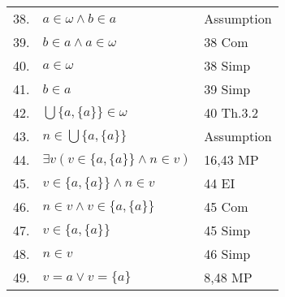\documentclass[12pt, a4paper]{article}
\begin{document}
\begin{table}[h!]
    \begin{center}
        \begin{tabular}{l l l}
        \hline
        
        38.& $a\in\omega\wedge b\in a$\hspace{140mm} & Assumption\\
        
        39.& \hspace{10mm}$b\in a\wedge a\in\omega$ & 38 Com\\
        
        40.& \hspace{10mm}$a\in\omega$ & 38 Simp\\
        
        41.& \hspace{10mm}$b\in a$ & 39 Simp\\
        
        42.& \hspace{10mm}$\bigcup\{a,\{a\}\}\in\omega$ & 40 Th.3.2\\
        
        43.& \hspace{10mm}$n\in\bigcup\{a,\{a\}\}$ & Assumption\\
        
        44.& \hspace{20mm}$\exists v(v\in\{a,\{a\}\}\wedge n\in v)$ & 16,43 MP\\
        
        45.& \hspace{20mm}$v\in\{a,\{a\}\}\wedge n\in v$ & 44 EI\\
        
        46.& \hspace{20mm}$n\in v\wedge v\in\{a,\{a\}\}$ & 45 Com\\
        
        47.& \hspace{20mm}$v\in\{a,\{a\}\}$ & 45 Simp\\
        
        48.& \hspace{20mm}$n\in v$ & 46 Simp\\
        
        49.& \hspace{20mm}$v=a\vee v=\{a\}$ & 8,48 MP\\
        
        \hline
        \end{tabular}
    \end{center}
\end{table}

\restoregeometry
\end{document}

